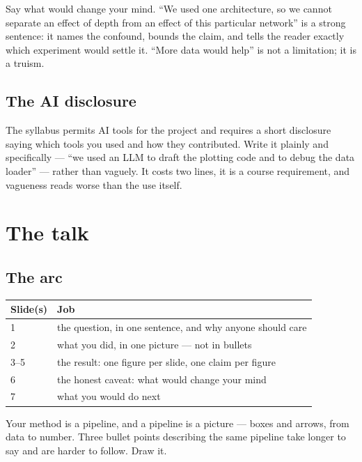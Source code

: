 \documentclass[11pt]{article}
\begin{document}
Say what would change your mind. ``We used one architecture, so we cannot
separate an effect of depth from an effect of this particular network'' is a
strong sentence: it names the confound, bounds the claim, and tells the reader
exactly which experiment would settle it. ``More data would help'' is not a
limitation; it is a truism.

\subsection{The AI disclosure}

The syllabus permits AI tools for the project and requires a short disclosure
saying which tools you used and how they contributed. Write it plainly and
specifically --- ``we used an LLM to draft the plotting code and to debug the data
loader'' --- rather than vaguely. It costs two lines, it is a course requirement,
and vagueness reads worse than the use itself.

\section{The talk}

\subsection{The arc}

\begin{center}
\begin{tabular}{@{}ll@{}}
\toprule
Slide(s) & Job \\
\midrule
1 & the question, in one sentence, and why anyone should care \\
2 & what you did, in one picture --- not in bullets \\
3--5 & the result: one figure per slide, one claim per figure \\
6 & the honest caveat: what would change your mind \\
7 & what you would do next \\
\bottomrule
\end{tabular}
\end{center}

\begin{keybox}
 Your method is a pipeline, and a
pipeline is a picture --- boxes and arrows, from data to number. Three bullet
points describing the same pipeline take longer to say and are harder to follow.
Draw it.
\end{keybox}
\end{document}
